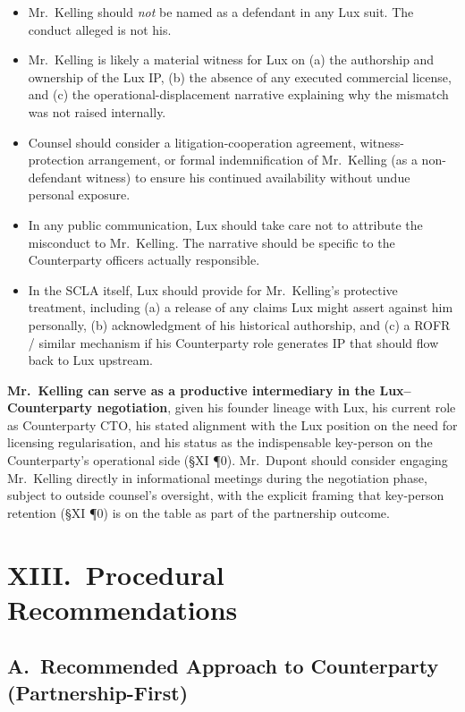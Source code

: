 \documentclass[11pt,letterpaper]{article}
\begin{document}
\begin{itemize}[leftmargin=1.5em,itemsep=0.1em]
\item Mr.\ Kelling should \emph{not} be named as a defendant in any
Lux suit. The conduct alleged is not his.
\item Mr.\ Kelling is likely a material witness for Lux on (a) the
authorship and ownership of the Lux IP, (b) the absence of any
executed commercial license, and (c) the operational-displacement
narrative explaining why the mismatch was not raised internally.
\item Counsel should consider a litigation-cooperation agreement,
witness-protection arrangement, or formal indemnification of Mr.\
Kelling (as a non-defendant witness) to ensure his continued
availability without undue personal exposure.
\item In any public communication, Lux should take care not to
attribute the misconduct to Mr.\ Kelling. The narrative should be
specific to the Counterparty officers actually responsible.
\item In the SCLA itself, Lux should provide for Mr.\ Kelling's
protective treatment, including (a) a release of any claims Lux
might assert against him personally, (b) acknowledgment of his
historical authorship, and (c) a ROFR / similar mechanism if his
Counterparty role generates IP that should flow back to Lux upstream.
\end{itemize}

\textbf{Mr.\ Kelling can serve as a productive intermediary in the
Lux--Counterparty negotiation}, given his founder lineage with Lux,
his current role as Counterparty CTO, his stated alignment with the
Lux position on the need for licensing regularisation, and his
status as the indispensable key-person on the Counterparty's
operational side (\S XI ¶0). Mr.\ Dupont should consider engaging
Mr.\ Kelling directly in informational meetings during the
negotiation phase, subject to outside counsel's oversight, with
the explicit framing that key-person retention (\S XI ¶0) is on
the table as part of the partnership outcome.

\section*{XIII.\ Procedural Recommendations}

\subsection*{A.\ Recommended Approach to Counterparty (Partnership-First)}
\end{document}
